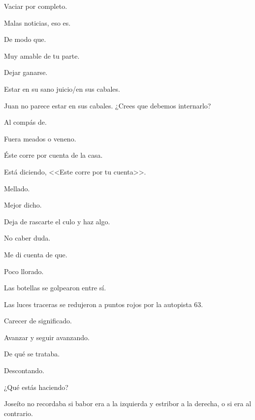 \sk
Vaciar por completo. 

\sk
Malas noticias, eso es. 

\sk
De modo que. 

\sk
Muy amable de tu parte. 

\sk
Dejar ganarse. 

\sk
Estar en su sano juicio/en sus cabales. 

\sk
Juan no parece estar en sus cabales. ¿Crees que debemos internarlo? 

\sk
Al compás de. 

\sk
Fuera meados o veneno. 

\sk
Éste corre por cuenta de la casa. 

\sk
Está diciendo, <<Este corre por tu cuenta>>. 

\sk
Mellado. 

\sk
Mejor dicho. 

\sk
Deja de rascarte el culo y haz algo. 

\sk
No caber duda. 

\sk
Me di cuenta de que. 

\sk
Poco llorado. 

\sk
Las botellas se golpearon entre sí. 

\sk
Las luces traceras se redujeron a puntos rojos por la autopista 63.\nb{}

\sk
Carecer de significado. 

\sk
Avanzar y seguir avanzando. 

\sk
De qué se trataba. 

\sk
Descontando. 

\sk
¿Qué estás haciendo? 

\sk
Joseíto no recordaba si babor era a la izquierda y estribor a la derecha, o si era al contrario. 

